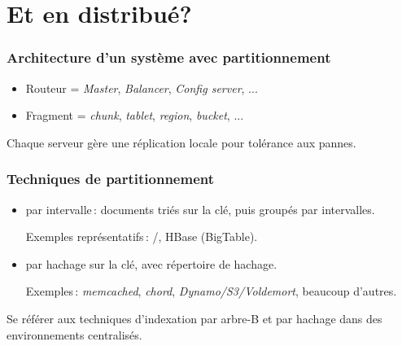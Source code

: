 \section{Et en distribué?}


\begin{frame}
\frametitle{Architecture d'un système avec partitionnement}

      
\begin{itemize}
  \item Routeur = \textit{Master}, \textit{Balancer}, \textit{Config server}, ...
  \item Fragment = \textit{chunk}, \textit{tablet}, \textit{region}, \textit{bucket}, ...
\end{itemize}

\begin{remark}
Chaque serveur gère une réplication locale pour tolérance aux pannes.
\end{remark}
\end{frame}


\begin{frame}
\frametitle{Techniques de partitionnement}

\begin{itemize}
   \item par \alert{intervalle}\,: documents triés sur la clé, puis groupés par intervalles.
   
     Exemples représentatifs\,: \mongodb/, HBase (BigTable).
     
   \item par \alert{hachage} sur la clé, avec répertoire de hachage.
   
       Exemples\,: \textit{memcached}, \textit{chord}, \textit{Dynamo/S3/Voldemort}, beaucoup d'autres.
 \end{itemize}
 

\begin{remark}
Se référer aux techniques d'indexation par arbre-B et par hachage dans des environnements centralisés.
\end{remark}
\end{frame}



